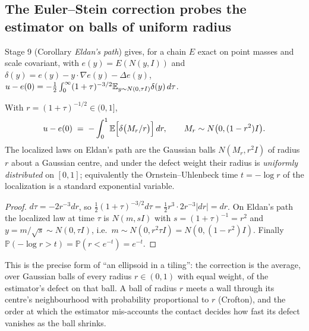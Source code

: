 \label{sec:clock}
\subsection{The Euler--Stein correction probes the estimator on balls of uniform radius}
Stage 9 (Corollary \emph{Eldan's path}) gives, for a chain $E$ exact on point masses and scale covariant, with
$e(y)=E(N(y,I))$ and $\delta(y)=e(y)-y\cdot\nabla e(y)-\Delta e(y)$,
$u-e(0)=-\tfrac12\int_0^\infty(1+\tau)^{-3/2}\mathbb E_{y\sim N(0,\tau I)}\delta(y)\,d\tau$.

\begin{theorem}\label{thm:uniform}
With $r=(1+\tau)^{-1/2}\in(0,1]$,
\[
u-e(0)\;=\;-\int_0^1\mathbb E\Big[\delta\big(M_r/r\big)\Big]\,dr,\qquad M_r\sim N\big(0,(1-r^2)I\big).
\]
The localized laws on Eldan's path are the Gaussian balls $N(M_r,r^2I)$ of radius $r$ about a Gaussian centre, and under
the defect weight their radius is \emph{uniformly distributed} on $[0,1]$; equivalently the Ornstein--Uhlenbeck time
$t=-\log r$ of the localization is a standard exponential variable.
\end{theorem}
\begin{proof}
$d\tau=-2r^{-3}dr$, so $\tfrac12(1+\tau)^{-3/2}d\tau=\tfrac12r^3\cdot2r^{-3}|dr|=dr$. On Eldan's path the localized law at
time $\tau$ is $N(m,sI)$ with $s=(1+\tau)^{-1}=r^2$ and $y=m/\sqrt s\sim N(0,\tau I)$, i.e.\ $m\sim N(0,r^2\tau I)=N(0,(1-r^2)I)$.
Finally $\mathbb P(-\log r>t)=\mathbb P(r<e^{-t})=e^{-t}$.
\end{proof}

This is the precise form of ``an ellipsoid in a tiling'': the correction is the average, over Gaussian balls of
every radius $r\in(0,1)$ with equal weight, of the estimator's defect on that ball. A ball of radius $r$ meets a wall
through its centre's neighbourhood with probability proportional to $r$ (Crofton), and the order at which the
estimator mis-accounts the contact decides how fast its defect vanishes as the ball shrinks.

